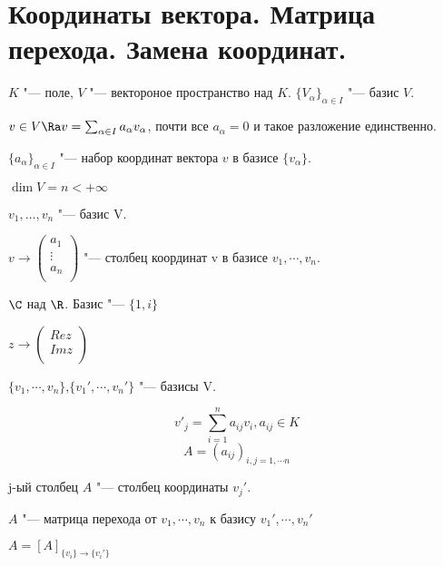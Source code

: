 ﻿\section{Координаты вектора. Матрица перехода. Замена координат.}

\begin{Def}
$K$ "---  поле, $V$ "--- вектороное пространство над $K$.
$\{V_{\alpha}\}_{\alpha \in I}$ "--- базис $V$.

$v \in V \Ra v = \sum_{\alpha \in I}a_{\alpha}v_{\alpha}$, почти все $a_{\alpha} = 0$
 и такое разложение единственно.

$\{a_{\alpha}\}_{\alpha \in I}$ "--- набор координат вектора $v$ в базисе $\{v_{\alpha}\}$.
\end{Def}

\begin{Def}
$\dim V = n < +\infty$

$v_1, \ldots, v_n$ "--- базис V.

$v \to 
\begin{pmatrix}
a_1\\
\vdots\\
a_n\\
\end{pmatrix}$ "--- столбец координат v в базисе $v_1, \cdots, v_n$.
\end{Def}

\begin{exmp}
$\C$ над $\R$. Базис "--- $\{1, i\}$

$z \to 
\begin{pmatrix}
Re z\\
Im z\\
\end{pmatrix}$ 
\end{exmp}

\begin{Def}
$\{v_1, \cdots, v_n\}$,$\{v_1', \cdots, v_n'\}$ "--- базисы V.

$$v'_j = \sum_{i = 1}^{n}a_{ij}v_i, a_{ij}\in K$$
$$A = (a_{ij})_{i, j = 1, \cdots n}$$

j-ый столбец $A$ "--- столбец координаты $v_j'$.

$A$ "--- матрица перехода от $v_1, \cdots, v_n$ к базису $v_1', \cdots, v_n'$

$A = [A]_{\{v_i\} \to \{v_i'\}}$                                          
\end{Def}


